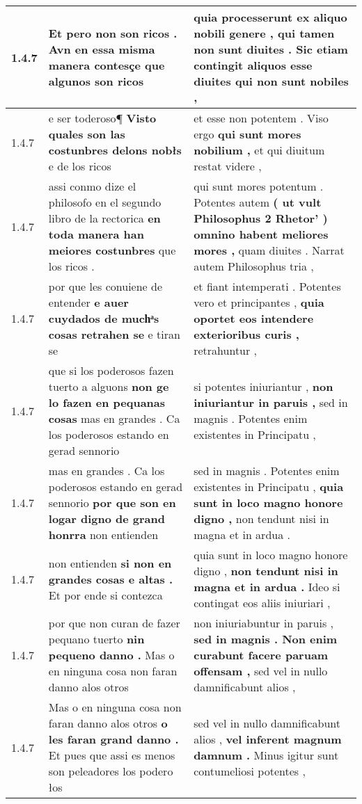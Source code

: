 \begin{tabular}{|p{1cm}|p{6.5cm}|p{6.5cm}|}
1.4.7 & Et pero non son ricos . \textbf{ Avn en essa misma manera contesçe } que algunos son ricos & quia processerunt ex aliquo nobili genere , \textbf{ qui tamen non sunt diuites . Sic etiam contingit aliquos esse diuites } qui non sunt nobiles , \\\hline
1.4.7 & e ser toderoso¶ \textbf{ Visto quales son las costunbres delons nobłs } e de los ricos & et esse non potentem . Viso ergo \textbf{ qui sunt mores nobilium , } et qui diuitum restat videre , \\\hline
1.4.7 & assi conmo dize el philosofo en el segundo libro de la rectorica \textbf{ en toda manera han meiores costunbres } que los ricos . & qui sunt mores potentum . Potentes autem \textbf{ ( ut vult Philosophus 2 Rhetor’ ) omnino habent meliores mores , } quam diuites . Narrat autem Philosophus tria , \\\hline
1.4.7 & por que les conuiene de entender \textbf{ e auer cuydados de muchͣs cosas retrahen se } e tiran se & et fiant intemperati . Potentes vero et principantes , \textbf{ quia oportet eos intendere exterioribus curis , } retrahuntur , \\\hline
1.4.7 & que si los poderosos fazen tuerto a alguons \textbf{ non ge lo fazen en pequanas cosas } mas en grandes . Ca los poderosos estando en gerad sennorio & si potentes iniuriantur , \textbf{ non iniuriantur in paruis , } sed in magnis . Potentes enim existentes in Principatu , \\\hline
1.4.7 & mas en grandes . Ca los poderosos estando en gerad sennorio \textbf{ por que son en logar digno de grand honrra } non entienden & sed in magnis . Potentes enim existentes in Principatu , \textbf{ quia sunt in loco magno honore digno , } non tendunt nisi in magna et in ardua . \\\hline
1.4.7 & non entienden \textbf{ si non en grandes cosas e altas . } Et por ende si contezca & quia sunt in loco magno honore digno , \textbf{ non tendunt nisi in magna et in ardua . } Ideo si contingat eos aliis iniuriari , \\\hline
1.4.7 & por que non curan de fazer pequano tuerto \textbf{ nin pequeno danno . } Mas o en ninguna cosa non faran danno alos otros & non iniuriabuntur in paruis , \textbf{ sed in magnis . Non enim curabunt facere paruam offensam , } sed vel in nullo damnificabunt alios , \\\hline
1.4.7 & Mas o en ninguna cosa non faran danno alos otros \textbf{ o les faran grand danno . } Et pues que assi es menos son peleadores los podero łos & sed vel in nullo damnificabunt alios , \textbf{ vel inferent magnum damnum . } Minus igitur sunt contumeliosi potentes , \\\hline

\end{tabular}
